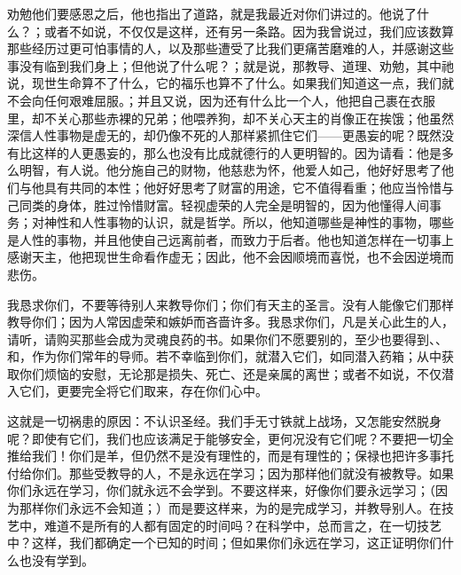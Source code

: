劝勉他们要感恩之后，他也指出了道路，就是我最近对你们讲过的。他说了什么？；或者不如说，不仅仅是这样，还有另一条路。因为我曾说过，我们应该数算那些经历过更可怕事情的人，以及那些遭受了比我们更痛苦磨难的人，并感谢这些事没有临到我们身上；但他说了什么呢？；就是说，那教导、道理、劝勉，其中祂说，现世生命算不了什么，它的福乐也算不了什么。如果我们知道这一点，我们就不会向任何艰难屈服。；并且又说，因为还有什么比一个人，他把自己裹在衣服里，却不关心那些赤裸的兄弟；他喂养狗，却不关心天主的肖像正在挨饿；他虽然深信人性事物是虚无的，却仍像不死的人那样紧抓住它们——更愚妄的呢？既然没有比这样的人更愚妄的，那么也没有比成就德行的人更明智的。因为请看：他是多么明智，有人说。他分施自己的财物，他慈悲为怀，他爱人如己，他好好思考了他们与他具有共同的本性；他好好思考了财富的用途，它不值得看重；他应当怜惜与己同类的身体，胜过怜惜财富。轻视虚荣的人完全是明智的，因为他懂得人间事务；对神性和人性事物的认识，就是哲学。所以，他知道哪些是神性的事物，哪些是人性的事物，并且他使自己远离前者，而致力于后者。他也知道怎样在一切事上感谢天主，他把现世生命看作虚无；因此，他不会因顺境而喜悦，也不会因逆境而悲伤。\par

我恳求你们，不要等待别人来教导你们；你们有天主的圣言。没有人能像它们那样教导你们；因为人常因虚荣和嫉妒而吝啬许多。我恳求你们，凡是关心此生的人，请听，请购买那些会成为灵魂良药的书。如果你们不愿要别的，至少也要得到、、和，作为你们常年的导师。若不幸临到你们，就潜入它们，如同潜入药箱；从中获取你们烦恼的安慰，无论那是损失、死亡、还是亲属的离世；或者不如说，不仅潜入它们，更要完全将它们取来，存在你们心中。\par

这就是一切祸患的原因：不认识圣经。我们手无寸铁就上战场，又怎能安然脱身呢？即使有它们，我们也应该满足于能够安全，更何况没有它们呢？不要把一切全推给我们！你们是羊，但仍然不是没有理性的，而是有理性的；保禄也把许多事托付给你们。那些受教导的人，不是永远在学习；因为那样他们就没有被教导。如果你们永远在学习，你们就永远不会学到。不要这样来，好像你们要永远学习；（因为那样你们永远不会知道；）而是要这样来，为的是完成学习，并教导别人。在技艺中，难道不是所有的人都有固定的时间吗？在科学中，总而言之，在一切技艺中？这样，我们都确定一个已知的时间；但如果你们永远在学习，这正证明你们什么也没有学到。\par


